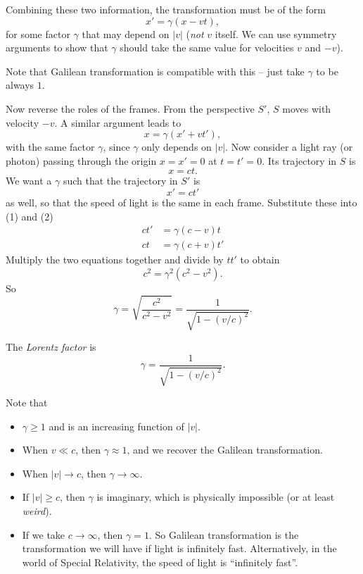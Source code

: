 \documentclass[a4paper]{article}
\begin{document}
Combining these two information, the transformation must be of the form
\[
  x' = \gamma(x - vt),\tag{1}
\]
for some factor $\gamma$ that may depend on $|v|$ (\emph{not} $v$ itself. We can use symmetry arguments to show that $\gamma$ should take the same value for velocities $v$ and $-v$).

Note that Galilean transformation is compatible with this -- just take $\gamma$ to be always $1$.

Now reverse the roles of the frames. From the perspective $S'$, $S$ moves with velocity $-v$. A similar argument leads to
\[
  x = \gamma(x' + vt'),\tag{2}
\]
with the same factor $\gamma$, since $\gamma$ only depends on $|v|$. Now consider a light ray (or photon) passing through the origin $x = x' = 0$ at $t = t' = 0$. Its trajectory in $S$ is
\[
  x = ct.
\]
We want a $\gamma$ such that the trajectory in $S'$ is
\[
  x' = ct'
\]
as well, so that the speed of light is the same in each frame. Substitute these into (1) and (2)
\begin{align*}
  ct' &= \gamma(c - v)t\\
  ct &= \gamma(c + v)t'
\end{align*}
Multiply the two equations together and divide by $tt'$ to obtain
\[
  c^2 = \gamma^2(c^2 - v^2).
\]
So
\[
  \gamma = \sqrt{\frac{c^2}{c^2 - v^2}} = \frac{1}{\sqrt{1 - (v/c)^2}}.
\]
\begin{defi}
  The \emph{Lorentz factor} is
  \[
    \gamma = \frac{1}{\sqrt{1 - (v/c)^2}}.
  \]
\end{defi}
Note that
\begin{itemize}
  \item $\gamma \geq 1$ and is an increasing function of $|v|$.
  \item When $v \ll c$, then $\gamma \approx 1$, and we recover the Galilean transformation.
  \item When $|v|\to c$, then $\gamma\to \infty$.
  \item If $|v| \geq c$, then $\gamma$ is imaginary, which is physically impossible (or at least \emph{weird}).
  \item If we take $c\to \infty$, then $\gamma = 1$. So Galilean transformation is the transformation we will have if light is infinitely fast. Alternatively, in the world of Special Relativity, the speed of light is ``infinitely fast''.
\end{itemize}
\begin{center}
\end{center}
\end{document}
